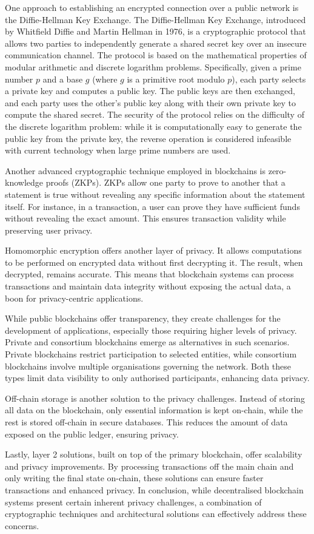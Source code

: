 One approach to establishing  an encrypted connection over a public network is the Diffie-Hellman Key Exchange. The Diffie-Hellman Key Exchange, introduced by Whitfield Diffie and Martin Hellman in 1976, is a cryptographic protocol that allows two parties to independently generate a shared secret key over an insecure communication channel. The protocol is based on the mathematical properties of modular arithmetic and discrete logarithm problems. Specifically, given a prime number \( p \) and a base \( g \) (where \( g \) is a primitive root modulo \( p \)), each party selects a private key and computes a public key. The public keys are then exchanged, and each party uses the other's public key along with their own private key to compute the shared secret. The security of the protocol relies on the difficulty of the discrete logarithm problem: while it is computationally easy to generate the public key from the private key, the reverse operation is considered infeasible with current technology when large prime numbers are used.

Another advanced cryptographic technique employed in blockchains is zero-knowledge proofs (ZKPs). ZKPs allow one party to prove to another that a statement is true without revealing any specific information about the statement itself. For instance, in a transaction, a user can prove they have sufficient funds without revealing the exact amount. This ensures transaction validity while preserving user privacy.

Homomorphic encryption offers another layer of privacy. It allows computations to be performed on encrypted data without first decrypting it. The result, when decrypted, remains accurate. This means that blockchain systems can process transactions and maintain data integrity without exposing the actual data, a boon for privacy-centric applications.

While public blockchains offer transparency, they create challenges for the development of applications, especially those requiring higher levels of privacy. Private and consortium blockchains emerge as alternatives in such scenarios. Private blockchains restrict participation to selected entities, while consortium blockchains involve multiple organisations governing the network. Both these types limit data visibility to only authorised participants, enhancing data privacy.

Off-chain storage is another solution to the privacy challenges. Instead of storing all data on the blockchain, only essential information is kept on-chain, while the rest is stored off-chain in secure databases. This reduces the amount of data exposed on the public ledger, ensuring privacy.

Lastly, layer 2 solutions, built on top of the primary blockchain, offer scalability and privacy improvements. By processing transactions off the main chain and only writing the final state on-chain, these solutions can ensure faster transactions and enhanced privacy. In conclusion, while decentralised blockchain systems present certain inherent privacy challenges, a combination of cryptographic techniques and architectural solutions can effectively address these concerns.

